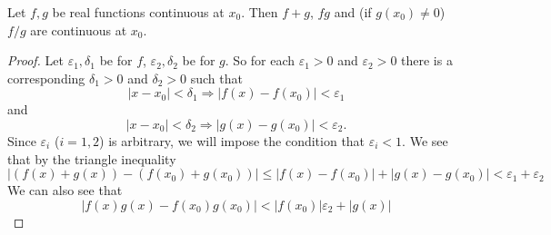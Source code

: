 \begin{thm}
Let $f,g$ be real functions continuous at $x_{0}$. Then $f+g$,
$fg$ and (if $g(x_{0})\neq0$) $f/g$ are continuous at $x_{0}$.
\end{thm}
\begin{proof}
Let $\varepsilon_{1},\delta_{1}$ be for $f$,
$\varepsilon_{2},\delta_{2}$ be for $g$. So for each
$\varepsilon_{1}>0$ and $\varepsilon_{2}>0$ there is a
corresponding $\delta_{1}>0$ and $\delta_{2}>0$ such that
\begin{equation}
|x-x_{0}|<\delta_{1}\Rightarrow|f(x)-f(x_{0})|<\varepsilon_{1}
\end{equation}
and
\begin{equation}
|x-x_{0}|<\delta_{2}\Rightarrow|g(x)-g(x_{0})|<\varepsilon_{2}.
\end{equation}
Since $\varepsilon_{i}$ ($i=1,2$) is arbitrary, we will impose the condition that $\varepsilon_{i}<1$.
We see that by the triangle inequality
\begin{equation}
|(f(x)+g(x))-(f(x_{0})+g(x_{0}))|\leq|f(x)-f(x_{0})|+|g(x)-g(x_{0})|<\varepsilon_{1}+\varepsilon_{2}
\end{equation}
We can also see that
\begin{equation}
|f(x)g(x)-f(x_{0})g(x_{0})|<|f(x_{0})|\varepsilon_{2} + |g(x)|
\end{equation}
\end{proof}
